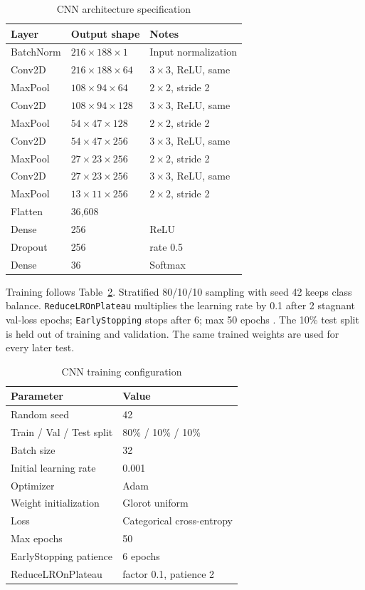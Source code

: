 \documentclass[pdflatex,sn-mathphys-num,iicol]{sn-jnl}
\theoremstyle{thmstyleone}
\theoremstyle{thmstyletwo}
\theoremstyle{thmstylethree}
\begin{document}
\begin{table}[t]
\caption{CNN architecture specification}\label{tab:cnn-architecture}
\begin{tabularx}{\columnwidth}{@{}lXl@{}}
\toprule
Layer & Output shape & Notes \\
\midrule
BatchNorm & $216{\times}188{\times}1$ & Input normalization \\
Conv2D & $216{\times}188{\times}64$ & $3{\times}3$, ReLU, same \\
MaxPool & $108{\times}94{\times}64$ & $2{\times}2$, stride 2 \\
Conv2D & $108{\times}94{\times}128$ & $3{\times}3$, ReLU, same \\
MaxPool & $54{\times}47{\times}128$ & $2{\times}2$, stride 2 \\
Conv2D & $54{\times}47{\times}256$ & $3{\times}3$, ReLU, same \\
MaxPool & $27{\times}23{\times}256$ & $2{\times}2$, stride 2 \\
Conv2D & $27{\times}23{\times}256$ & $3{\times}3$, ReLU, same \\
MaxPool & $13{\times}11{\times}256$ & $2{\times}2$, stride 2 \\
Flatten & 36{,}608 & \\
Dense & 256 & ReLU \\
Dropout & 256 & rate 0.5 \\
Dense & 36 & Softmax \\
\bottomrule
\end{tabularx}
\end{table}

Training follows Table~\ref{tab:cnn-training-config}. Stratified 80/10/10 sampling with seed 42 keeps class balance. \texttt{ReduceLROnPlateau} multiplies the learning rate by 0.1 after 2 stagnant val-loss epochs; \texttt{EarlyStopping} stops after 6; max 50 epochs \cite{Wolf-Monheim2025}. The 10\% test split is held out of training and validation. The same trained weights are used for every later test.

\begin{table}[t]
\caption{CNN training configuration}\label{tab:cnn-training-config}
\begin{tabular}{@{}ll@{}}
\toprule
Parameter & Value \\
\midrule
Random seed & 42 \\
Train / Val / Test split & 80\% / 10\% / 10\% \\
Batch size & 32 \\
Initial learning rate & 0.001 \\
Optimizer & Adam \\
Weight initialization & Glorot uniform \\
Loss & Categorical cross-entropy \\
Max epochs & 50 \\
EarlyStopping patience & 6 epochs \\
ReduceLROnPlateau & factor 0.1, patience 2 \\
\bottomrule
\end{tabular}
\end{table}
\end{document}
